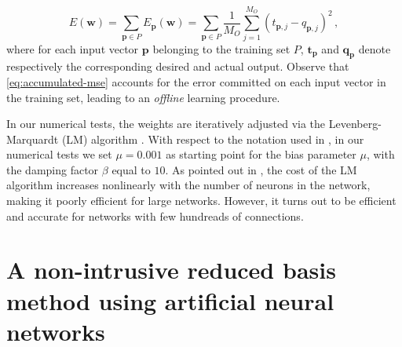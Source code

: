 \documentclass[longtitle]{elsarticle}
\numberwithin{equation}{section}
\theoremstyle{theorem}
\theoremstyle{definition}
\theoremstyle{remark}
\theoremstyle{proposition}
\numberwithin{figure}{section}
\begin{document}
		\begin{equation}
			\label{eq:accumulated-mse}
			E(\mathbf{w}) = \sum_{\mathbf{p} \in P} E_{\mathbf{p}}(\mathbf{w}) = \sum_{\mathbf{p} \in P} \dfrac{1}{M_O} \sum_{j = 1}^{M_O} \left( t_{\mathbf{p},j} - q_{\mathbf{p},j} \right)^2 \, ,
		\end{equation}
		where for each input vector $\mathbf{p}$ belonging to the training set $P$, $\mathbf{t}_{\mathbf{p}}$ and $\mathbf{q}_{\mathbf{p}}$ denote respectively the corresponding desired and actual output. Observe that \eqref{eq:accumulated-mse} accounts for the error committed on each input vector in the training set, leading to an \emph{offline} learning procedure.
		
		In our numerical tests, the weights are iteratively adjusted via the Levenberg-Marquardt (LM) algorithm \cite{Lev44, Mar63}. With respect to the notation used in \cite{Hag94}, in our numerical tests we set $\mu = 0.001$ as starting point for the bias parameter $\mu$, with the damping factor $\beta$ equal to $10$. As pointed out in \cite{Hag96}, the cost of the LM algorithm increases nonlinearly with the number of neurons in the network, making it poorly efficient for large networks. However, it turns out to be efficient and accurate for networks with few hundreads of connections.  		

	
	\section{A non-intrusive reduced basis method using artificial neural networks}
	\label{section:A non-intrusive RB method using neural networks}
							
\end{document}
